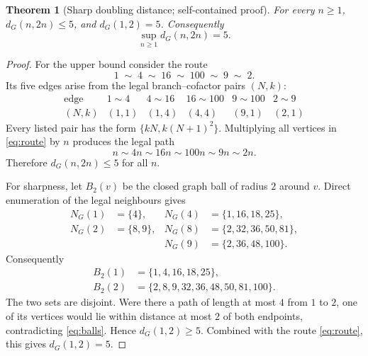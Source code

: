\documentclass[11pt,a4paper]{article}
\newtheorem{theorem}{Theorem}[section]
\theoremstyle{definition}\newtheorem{definition}[theorem]{Definition}
\begin{document}
\begin{theorem}[Sharp doubling distance; self-contained proof]\label{thm:doubling}
For every $n\ge1$, $d_G(n,2n)\le5$, and $d_G(1,2)=5$. Consequently
\begin{equation}\label{eq:double}
\sup_{n\ge1}d_G(n,2n)=5.
\end{equation}
\end{theorem}
\begin{proof}
For the upper bound consider the route
\begin{equation}\label{eq:route}
1\;\sim\;4\;\sim\;16\;\sim\;100\;\sim\;9\;\sim\;2.
\end{equation}
Its five edges arise from the legal branch--cofactor pairs $(N,k)$:
\begin{equation*}
\begin{array}{c|c|c|c|c|c}
\text{edge} & 1\sim4 &4\sim16&16\sim100&9\sim100&2\sim9\\\hline
(N,k)&(1,1)&(1,4)&(4,4)&(9,1)&(2,1)
\end{array}
\end{equation*}
Every listed pair has the form $\{kN,k(N+1)^2\}$. Multiplying all vertices in \eqref{eq:route} by $n$ produces the legal path
\[
n\sim4n\sim16n\sim100n\sim9n\sim2n.
\]
Therefore $d_G(n,2n)\le5$ for all $n$.

For sharpness, let $B_2(v)$ be the closed graph ball of radius $2$ around $v$. Direct enumeration of the legal neighbours gives
\begin{align*}
N_G(1)&=\{4\},&N_G(4)&=\{1,16,18,25\},\\
N_G(2)&=\{8,9\},&N_G(8)&=\{2,32,36,50,81\},\\
&&N_G(9)&=\{2,36,48,100\}.
\end{align*}
Consequently
\begin{align}\label{eq:balls}
B_2(1)&=\{1,4,16,18,25\},\\
B_2(2)&=\{2,8,9,32,36,48,50,81,100\}.
\end{align}
The two sets are disjoint. Were there a path of length at most $4$ from $1$ to $2$, one of its vertices would lie within distance at most $2$ of both endpoints, contradicting \eqref{eq:balls}. Hence $d_G(1,2)\ge5$. Combined with the route \eqref{eq:route}, this gives $d_G(1,2)=5$.
\end{proof}
\end{document}
